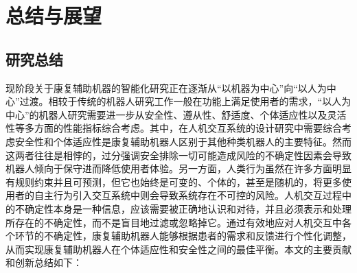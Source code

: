 \chapter{总结与展望}
\section{研究总结}
现阶段关于康复辅助机器的智能化研究正在逐渐从``以机器为中心''向``以人为中心''过渡。相较于传统的机器人研究工作一般在功能上满足使用者的需求，``以人为中心''的机器人研究需要进一步从安全性、遵从性、舒适度、个体适应性以及灵活性等多方面的性能指标综合考虑。其中，在人机交互系统的设计研究中需要综合考虑安全性和个体适应性是康复辅助机器人区别于其他种类机器人的主要特征。然而这两者往往是相悖的，过分强调安全排除一切可能造成风险的不确定性因素会导致机器人倾向于保守进而降低使用者体验。另一方面，人类行为虽然在许多方面明显有规则约束并且可预测，但它也始终是可变的、个体的，甚至是随机的，将更多使用者的自主行为引入交互系统中则会导致系统存在不可控的风险。人机交互过程中的不确定性本身是一种信息，应该需要被正确地认识和对待，并且必须表示和处理所存在的不确定性，而不是盲目地过滤或忽略掉它。通过有效地应对人机交互中各个环节的不确定性，康复辅助机器人能够根据患者的需求和反馈进行个性化调整，从而实现康复辅助机器人在个体适应性和安全性之间的最佳平衡。本文的主要贡献和创新总结如下：

